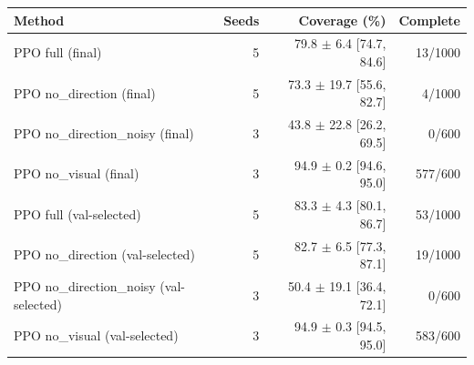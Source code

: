 \begin{tabular}{lrrr}
\toprule
Method & Seeds & Coverage (\%) & Complete \\
\midrule
PPO full (final) & 5 & 79.8 $\pm$ 6.4 [74.7, 84.6] & 13/1000 \\
PPO no_direction (final) & 5 & 73.3 $\pm$ 19.7 [55.6, 82.7] & 4/1000 \\
PPO no_direction_noisy (final) & 3 & 43.8 $\pm$ 22.8 [26.2, 69.5] & 0/600 \\
PPO no_visual (final) & 3 & 94.9 $\pm$ 0.2 [94.6, 95.0] & 577/600 \\
PPO full (val-selected) & 5 & 83.3 $\pm$ 4.3 [80.1, 86.7] & 53/1000 \\
PPO no_direction (val-selected) & 5 & 82.7 $\pm$ 6.5 [77.3, 87.1] & 19/1000 \\
PPO no_direction_noisy (val-selected) & 3 & 50.4 $\pm$ 19.1 [36.4, 72.1] & 0/600 \\
PPO no_visual (val-selected) & 3 & 94.9 $\pm$ 0.3 [94.5, 95.0] & 583/600 \\
\bottomrule
\end{tabular}